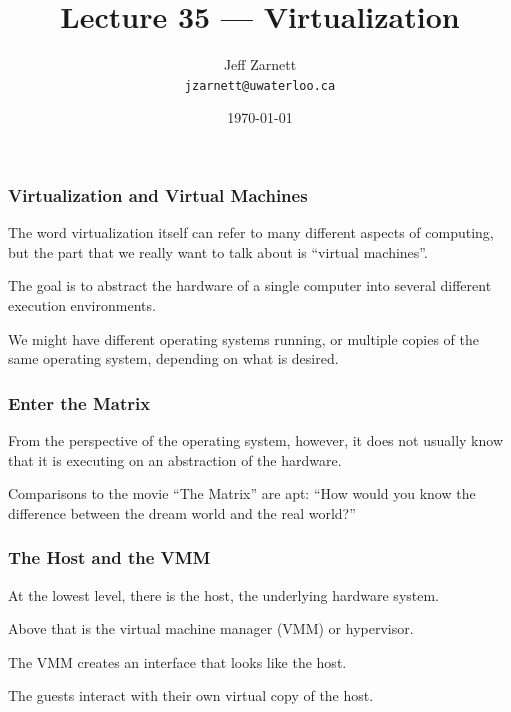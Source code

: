 

\title{Lecture 35 --- Virtualization }

\author{Jeff Zarnett \\ \small \texttt{jzarnett@uwaterloo.ca}}
\date{\today}




\begin{frame}
  \titlepage

 \end{frame}



\begin{frame}
\frametitle{Virtualization and Virtual Machines}

The word virtualization itself can refer to many different aspects of computing, but the part that we really want to talk about is ``virtual machines''. 

The goal is to abstract the hardware of a single computer into several different execution environments. 

We might have different operating systems running, or multiple copies of the same operating system, depending on what is desired. 

\end{frame}

\begin{frame}
\frametitle{Enter the Matrix}

From the perspective of the operating system, however, it does not usually know that it is executing on an abstraction of the hardware. 

Comparisons to the movie ``The Matrix'' are apt: ``How would you know the difference between the dream world and the real world?''



\end{frame}

\begin{frame}
\frametitle{The Host and the VMM}


At the lowest level, there is the \alert{host}, the underlying hardware system. 

Above that is the \alert{virtual machine manager} (VMM) or \alert{hypervisor}.

The VMM creates an interface that looks like the host. 

The \alert{guest}s interact with their own virtual copy of the host.

\end{frame}

